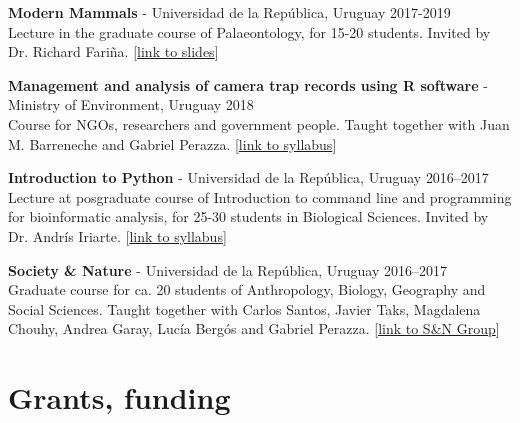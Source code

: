 \begin{innerlist}

\item[]{\bf Modern Mammals} - Universidad de la Rep\'{u}blica, Uruguay
\hfill {2017-2019}\\
Lecture in the graduate course of Palaeontology, for 15-20 students. Invited by Dr. Richard Fari\~{n}a. 
[\href{https://flograttarola.com/pdf/mamiferos_julana.pdf}{link to slides}]

\medskip

\item[]{\bf Management and analysis of camera trap records using R software} - Ministry of Environment, Uruguay
\hfill {2018}\\
Course for NGOs, researchers and government people. Taught together with Juan M. Barreneche and Gabriel Perazza.
[\href{https://github.com/bienflorencia/curso_camtrapR}{link to syllabus}]

\medskip

\item[]{\bf Introduction to Python} - Universidad de la Rep\'{u}blica, Uruguay
\hfill {2016--2017}\\
Lecture at posgraduate course of Introduction to command line and programming for bioinformatic analysis, for 25-30 students in Biological Sciences. Invited by Dr. Andr\'{i}s Iriarte. 
[\href{https://github.com/bienflorencia/clases_python}{link to syllabus}]

\medskip

\item[]{\bf Society \& Nature} - Universidad de la Rep\'{u}blica, Uruguay
\hfill {2016--2017}\\
Graduate course for ca. 20 students of Anthropology, Biology, Geography and Social Sciences. Taught together with Carlos Santos, Javier Taks, Magdalena Chouhy, Andrea Garay, Luc\'{i}a Berg\'{o}s and Gabriel Perazza.
[\href{https://udelar.edu.uy/retema/actividades/grupos-de-trabajo/}{link to S\&N Group}]

\end{innerlist}

\HRule

\section{Grants, funding}

